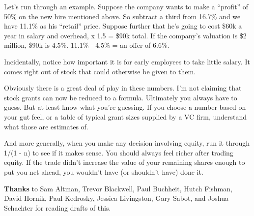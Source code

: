 Let's run through an example. Suppose the company wants to make a
``profit'' of 50\% on the new hire mentioned above. So subtract a third
from 16.7\% and we have 11.1\% as his ``retail'' price. Suppose further
that he's going to cost \$60k a year in salary and overhead, x 1.5 =
\$90k total. If the company's valuation is \$2 million, \$90k is 4.5\%.
11.1\% - 4.5\% = an offer of 6.6\%.

Incidentally, notice how important it is for early employees to take
little salary. It comes right out of stock that could otherwise be given
to them.

Obviously there is a great deal of play in these numbers. I'm not
claiming that stock grants can now be reduced to a formula. Ultimately
you always have to guess. But at least know what you're guessing. If you
choose a number based on your gut feel, or a table of typical grant
sizes supplied by a VC firm, understand what those are estimates of.

And more generally, when you make any decision involving equity, run it
through 1/(1 - n) to see if it makes sense. You should always feel
richer after trading equity. If the trade didn't increase the value of
your remaining shares enough to put you net ahead, you wouldn't have (or
shouldn't have) done it.


\textbf{Thanks} to Sam Altman, Trevor Blackwell, Paul Buchheit, Hutch
Fishman, David Hornik, Paul Kedrosky, Jessica Livingston, Gary Sabot,
and Joshua Schachter for reading drafts of this.
